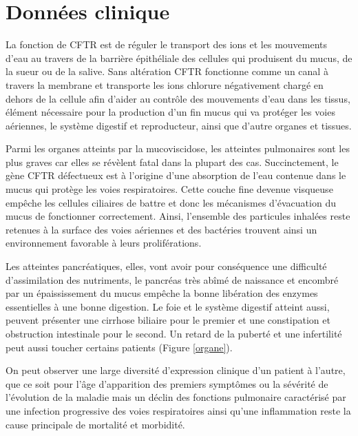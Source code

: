 
\chapter{Données clinique}

\label{ch:02-02} %


La fonction de CFTR est de réguler le transport des ions et les mouvements d’eau au travers de la barrière épithéliale des cellules qui produisent du mucus, de la sueur ou de la salive. Sans altération CFTR fonctionne comme un canal à travers la membrane et transporte les ions chlorure négativement chargé en dehors de la cellule afin d’aider au contrôle des mouvements d’eau dans les tissus, élément nécessaire pour la production d’un fin mucus qui va protéger les voies aériennes, le système digestif et reproducteur, ainsi que d’autre organes et tissues.

Parmi les organes atteints par la mucoviscidose, les atteintes pulmonaires sont les plus graves car elles se révèlent fatal dans la plupart des cas. Succinctement, le gène CFTR défectueux est à l’origine d’une absorption de l’eau contenue dans le mucus qui protège les voies respiratoires. Cette couche fine devenue visqueuse empêche les cellules ciliaires de battre et donc les mécanismes d’évacuation du mucus de fonctionner correctement. Ainsi, l’ensemble des particules inhalées reste retenues à la surface des voies aériennes et des bactéries trouvent ainsi un environnement favorable à leurs proliférations.

Les atteintes pancréatiques, elles, vont avoir pour conséquence une difficulté d’assimilation des nutriments, le pancréas très abîmé de naissance et encombré par un épaississement du mucus empêche la bonne libération des enzymes essentielles à une bonne digestion. Le foie et le système digestif atteint aussi, peuvent présenter une cirrhose biliaire pour le premier et une constipation et obstruction intestinale pour le second. Un retard de la puberté et une infertilité peut aussi toucher certains patients (Figure \ref{organe}).

On peut observer une large diversité d’expression clinique d’un patient à l’autre, que ce soit pour l’âge d’apparition des premiers symptômes ou la sévérité de l’évolution de la maladie mais un déclin des fonctions pulmonaire caractérisé par une infection progressive des voies respiratoires ainsi qu’une inflammation reste la cause principale de mortalité et morbidité.


